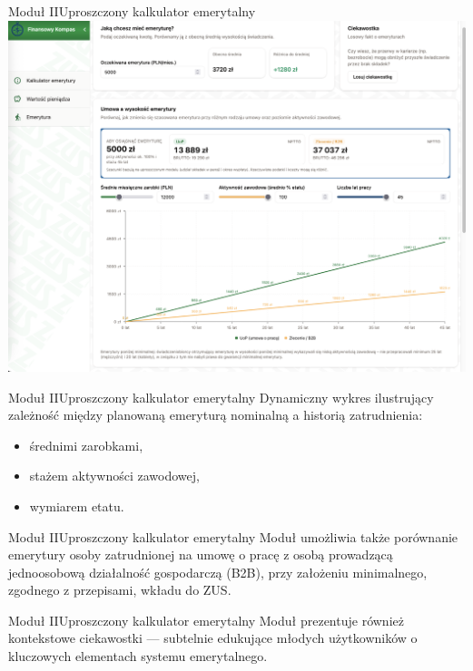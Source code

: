 \begin{frame}[t]{Moduł II}{Uproszczony kalkulator emerytalny}
  \includegraphics[width=.8\textwidth]{img/module_2_simple_pension_calculator}
\end{frame}

\begin{frame}[t]{Moduł II}{Uproszczony kalkulator emerytalny}
Dynamiczny wykres ilustrujący zależność między planowaną emeryturą nominalną a historią zatrudnienia:
\begin{itemize}
  \item średnimi zarobkami,
  \item stażem aktywności zawodowej,
  \item wymiarem etatu.
\end{itemize}
\end{frame}

\begin{frame}[t]{Moduł II}{Uproszczony kalkulator emerytalny}
Moduł umożliwia także porównanie emerytury osoby zatrudnionej na umowę o pracę
z osobą prowadzącą jednoosobową działalność gospodarczą (B2B),
przy założeniu minimalnego, zgodnego z przepisami, wkładu do ZUS.
\end{frame}

\begin{frame}[t]{Moduł II}{Uproszczony kalkulator emerytalny}
Moduł prezentuje również kontekstowe ciekawostki ---
subtelnie edukujące młodych użytkowników o kluczowych elementach systemu emerytalnego.
\end{frame}

